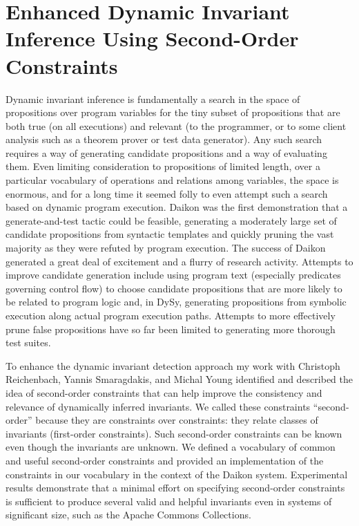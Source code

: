 \documentclass[proposal]{umthesis} %
\begin{document}
\section{Enhanced Dynamic Invariant Inference Using Second-Order Constraints}
Dynamic invariant inference is fundamentally a search in the space of propositions over program variables for the tiny subset of propositions that are both true (on all executions) and relevant (to the programmer, or to some client analysis such as a theorem prover or test data generator). Any such search requires a way of generating candidate propositions and a way of evaluating them. Even limiting consideration to propositions of limited length, over a particular vocabulary of operations and relations among variables, the space is enormous, and for a long time it seemed folly to even attempt such a search based on dynamic program execution.  Daikon\cite{ernst99dynamically}  was the first demonstration that a generate-and-test tactic could be feasible, generating a moderately large set of candidate propositions from syntactic templates and quickly pruning the vast majority as they were refuted by program execution.  The success of Daikon generated a great deal of excitement and a flurry of research activity.  Attempts to improve candidate generation include using program text (especially predicates governing control flow) to choose candidate propositions that are more likely to be related to program logic and, in DySy\cite{csallner08dysy}, generating propositions from symbolic execution along actual program execution paths.   Attempts to more effectively prune false propositions have so far been limited to generating more thorough test suites\cite{godefroid05dart,1081750}.

To enhance the dynamic invariant detection approach my work\cite{Li:2013:SCD:2491411.2491457} with Christoph Reichenbach, Yannis Smaragdakis, and Michal Young identified and described the idea of second-order constraints that can help improve the consistency and relevance of dynamically inferred invariants.  We called these constraints “second-order” because they are constraints over constraints: they relate classes of invariants (first-order constraints). Such second-order constraints can be known even though the invariants are unknown.  We defined a vocabulary of common and useful second-order constraints and provided an implementation of the constraints in our vocabulary in the context of the Daikon system.  Experimental results demonstrate that a minimal effort on specifying second-order constraints is sufficient to produce several valid and helpful invariants even in systems of significant size, such as the Apache Commons Collections.
\end{document}

